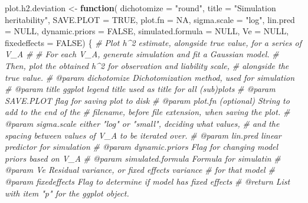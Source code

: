 \documentclass[
]{article}
\newenvironment{Shaded}{\begin{snugshade}}{\end{snugshade}}
\newcommand{\AttributeTok}[1]{\textcolor[rgb]{0.13,0.29,0.53}{#1}}
\newcommand{\CommentTok}[1]{\textcolor[rgb]{0.56,0.35,0.01}{\textit{#1}}}
\newcommand{\ConstantTok}[1]{\textcolor[rgb]{0.56,0.35,0.01}{#1}}
\newcommand{\ControlFlowTok}[1]{\textcolor[rgb]{0.13,0.29,0.53}{\textbf{#1}}}
\newcommand{\NormalTok}[1]{#1}
\newcommand{\OtherTok}[1]{\textcolor[rgb]{0.56,0.35,0.01}{#1}}
\newcommand{\StringTok}[1]{\textcolor[rgb]{0.31,0.60,0.02}{#1}}
\begin{document}
\begin{Shaded}
\begin{Highlighting}[]
\NormalTok{plot.h2.deviation }\OtherTok{\textless{}{-}} \ControlFlowTok{function}\NormalTok{(}
    \AttributeTok{dichotomize =} \StringTok{"round"}\NormalTok{,}
    \AttributeTok{title =} \StringTok{"Simulation heritability"}\NormalTok{,}
    \AttributeTok{SAVE.PLOT =} \ConstantTok{TRUE}\NormalTok{, }\AttributeTok{plot.fn =} \ConstantTok{NA}\NormalTok{, }\AttributeTok{sigma.scale =} \StringTok{"log"}\NormalTok{,}
    \AttributeTok{lin.pred =} \ConstantTok{NULL}\NormalTok{,}
    \AttributeTok{dynamic.priors =} \ConstantTok{FALSE}\NormalTok{, }\AttributeTok{simulated.formula =} \ConstantTok{NULL}\NormalTok{, }\AttributeTok{Ve =} \ConstantTok{NULL}\NormalTok{,}
    \AttributeTok{fixedeffects =} \ConstantTok{FALSE}\NormalTok{) \{}
  \CommentTok{\#\textquotesingle{} Plot h\^{}2 estimate, alongside true value, for a series of V\_A}
  \CommentTok{\#\textquotesingle{}}
  \CommentTok{\#\textquotesingle{} For each V\_A, generate simulation and fit a Gaussian model.}
  \CommentTok{\#\textquotesingle{} Then, plot the obtained h\^{}2 for observation and liability scale,}
  \CommentTok{\#\textquotesingle{} alongside the true value.}
  \CommentTok{\#\textquotesingle{} @param dichotomize Dichotomization method, used for simulation}
  \CommentTok{\#\textquotesingle{} @param title ggplot legend title used as title for all (sub)plots}
  \CommentTok{\#\textquotesingle{} @param SAVE.PLOT flag for saving plot to disk}
  \CommentTok{\#\textquotesingle{} @param plot.fn (optional) String to add to the end of the }
  \CommentTok{\#\textquotesingle{} filename, before file extension, when saving the plot.}
  \CommentTok{\#\textquotesingle{} @param sigma.scale either "log" or "small", deciding what values,}
  \CommentTok{\#\textquotesingle{} and the spacing between values of V\_A to be iterated over.}
  \CommentTok{\#\textquotesingle{} @param lin.pred linear predictor for simulation}
  \CommentTok{\#\textquotesingle{} @param dynamic.priors Flag for changing model priors based on V\_A}
  \CommentTok{\#\textquotesingle{} @param simulated.formula Formula for simulatin}
  \CommentTok{\#\textquotesingle{} @param Ve Residual variance, or fixed effects variance}
  \CommentTok{\#\textquotesingle{} for that model}
  \CommentTok{\#\textquotesingle{} @param fixedeffects Flag to determine if model has fixed effects}
  \CommentTok{\#\textquotesingle{} @return List with item "p" for the ggplot object.}


\end{Highlighting}
\end{Shaded}
\end{document}
